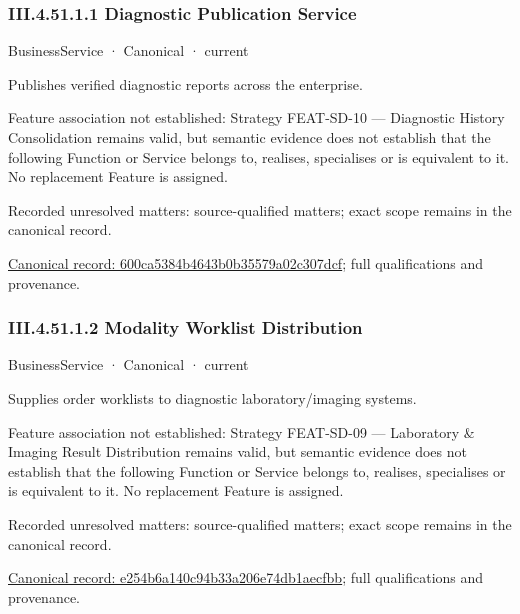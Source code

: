 \subsubsection*{III.4.51.1.1 Diagnostic Publication Service}
\label{navigation:III.4.51.1.1}

\label{element:600ca5384b4643b0b35579a02c307dcf}
{\small BusinessService · Canonical · current}\par

Publishes verified diagnostic reports across the enterprise.



Feature association not established: Strategy FEAT-SD-10 — Diagnostic History Consolidation remains valid, but semantic evidence does not establish that the following Function or Service belongs to, realises, specialises or is equivalent to it. No replacement Feature is assigned.


{\small Recorded unresolved matters: source-qualified matters; exact scope remains in the canonical record.}\par
{\footnotesize \href{../../../../continuum/business/business-service/600ca5384b4643b0b35579a02c307dcf.md}{Canonical record: 600ca5384b4643b0b35579a02c307dcf}; full qualifications and provenance.}\par
\subsubsection*{III.4.51.1.2 Modality Worklist Distribution}
\label{navigation:III.4.51.1.2}

\label{element:e254b6a140c94b33a206e74db1aecfbb}
{\small BusinessService · Canonical · current}\par

Supplies order worklists to diagnostic laboratory/imaging systems.



Feature association not established: Strategy FEAT-SD-09 — Laboratory \& Imaging Result Distribution remains valid, but semantic evidence does not establish that the following Function or Service belongs to, realises, specialises or is equivalent to it. No replacement Feature is assigned.


{\small Recorded unresolved matters: source-qualified matters; exact scope remains in the canonical record.}\par
{\footnotesize \href{../../../../continuum/business/business-service/e254b6a140c94b33a206e74db1aecfbb.md}{Canonical record: e254b6a140c94b33a206e74db1aecfbb}; full qualifications and provenance.}\par
